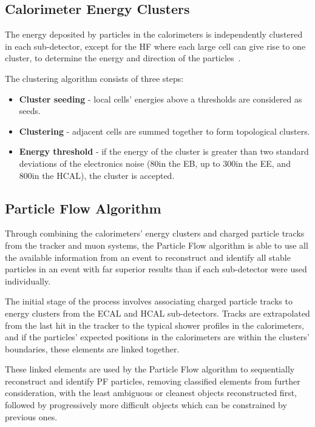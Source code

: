 \subsection{Calorimeter Energy Clusters}\label{subsec:clustering}
The energy deposited by particles in the calorimeters is independently clustered in each sub-detector, except for the HF where each large cell can give rise to one cluster, to determine the energy and direction of the particles~\cite{CMS:2009nxa}.

The clustering algorithm consists of three steps:
\begin{itemize}
\item \textbf{Cluster seeding} - local cells' energies above a thresholds are considered as seeds.
\item \textbf{Clustering} - adjacent cells are summed together to form topological clusters.
\item \textbf{Energy threshold} - if the energy of the cluster is greater than two standard deviations of the electronics noise (80\MeV in the EB, up to 300\MeV in the EE, and 800\MeV in the HCAL), the cluster is accepted.
\end{itemize}

\subsection{Particle Flow Algorithm}\label{subsec:PF}
Through combining the calorimeters' energy clusters and charged particle tracks from the tracker and muon systems, the Particle Flow algorithm is able to use all the available information from an event to reconstruct and identify all stable particles in an event with far superior results than if each sub-detector were used individually.

The initial stage of the process involves associating charged particle tracks to energy clusters from the ECAL and HCAL sub-detectors.
Tracks are extrapolated from the last hit in the tracker to the typical shower profiles in the calorimeters, and if the particles' expected positions in the calorimeters are within the clusters' boundaries, these elements are linked together.

These linked elements are used by the Particle Flow algorithm to sequentially reconstruct and identify PF particles, removing classified elements from further consideration, with the least ambiguous or cleanest objects reconstructed first, followed by progressively more difficult objects which can be constrained by previous ones.

